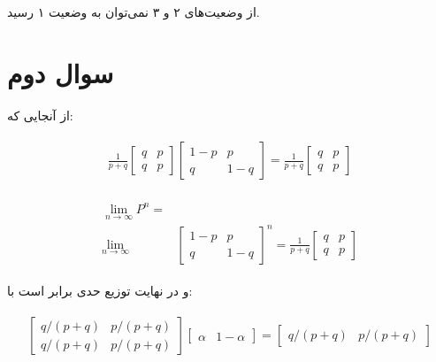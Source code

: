 \documentclass[paper=a4, fontsize=11pt]{article}
\numberwithin{equation}{section} %
\numberwithin{figure}{section} %
\numberwithin{table}{section} %
\begin{document}
از وضعیت‌های ۲ و ۳ نمی‌توان به وضعیت ۱ رسید.

\section{سوال دوم}

از آنجایی که:

\begin{align}
\begin{split}
    \frac{1}{p + q}
    \begin{bmatrix}
        q & p \\
        q & p
    \end{bmatrix}
    \begin{bmatrix}
        1 - p & p \\
        q & 1 - q
    \end{bmatrix}
    =
    \frac{1}{p + q}
    \begin{bmatrix}
        q & p \\
        q & p
    \end{bmatrix}
\end{split}
\end{align}

\begin{align}
\begin{split}
    \lim_{n\to\infty} P^n = &\\
    \lim_{n\to\infty}
    & \begin{bmatrix}
        1 - p & p \\
        q & 1 - q
    \end{bmatrix}^n
    = \frac{1}{p + q}
    \begin{bmatrix}
        q & p \\
        q & p
    \end{bmatrix}
\end{split}
\end{align}

و در نهایت توزیع حدی برابر است با:

\begin{align}
\begin{split}
    \begin{bmatrix}
        q/(p + q) & p/(p + q) \\
        q/(p + q) & p/(p + q)
    \end{bmatrix}
    \begin{bmatrix}
        \alpha & 1 - \alpha
    \end{bmatrix}
    =
    \begin{bmatrix}
        q/(p + q) & p/(p + q)
    \end{bmatrix}
\end{split}
\end{align}
\end{document}
